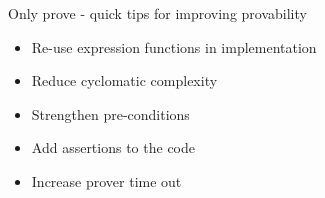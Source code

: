 \documentclass{beamer}
\begin{document}
\begin{frame}[fragile]{Only prove - quick tips for improving provability}
  \begin{itemize}
        \item Re-use expression functions in implementation
        \item Reduce cyclomatic complexity
        \item Strengthen pre-conditions
        \item Add assertions to the code
        \item Increase prover time out
  \end{itemize}
\end{frame}
\end{document}
